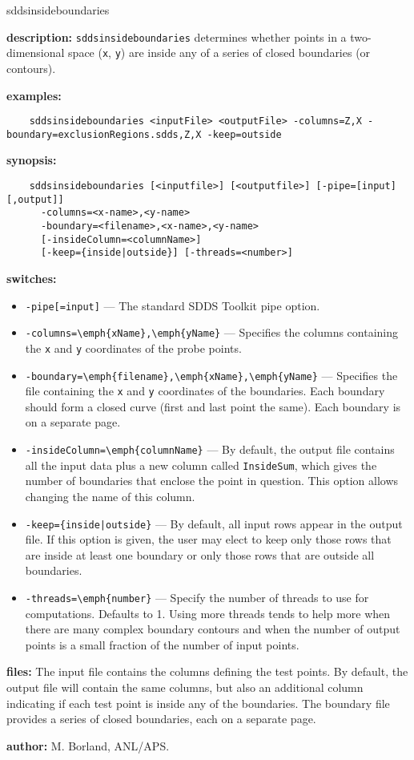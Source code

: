 \begin{sddsprog}{sddsinsideboundaries}
  \item {\bf description:} \verb|sddsinsideboundaries| determines whether points in a two-dimensional space (\verb|x|, \verb|y|) are inside any of a series of closed boundaries (or contours).
  \item {\bf examples:}
    \begin{verbatim}
    sddsinsideboundaries <inputFile> <outputFile> -columns=Z,X -boundary=exclusionRegions.sdds,Z,X -keep=outside
    \end{verbatim}
  \item {\bf synopsis:}
    \begin{verbatim}
    sddsinsideboundaries [<inputfile>] [<outputfile>] [-pipe=[input][,output]]
      -columns=<x-name>,<y-name>
      -boundary=<filename>,<x-name>,<y-name>
      [-insideColumn=<columnName>]
      [-keep={inside|outside}] [-threads=<number>]
    \end{verbatim}
  \item {\bf switches:}
    \begin{itemize}
      \item \verb|-pipe[=input]| --- The standard SDDS Toolkit pipe option.
      \item \verb|-columns=\emph{xName},\emph{yName}| --- Specifies the columns containing the \verb|x| and \verb|y| coordinates of the probe points.
      \item \verb|-boundary=\emph{filename},\emph{xName},\emph{yName}| --- Specifies the file containing the \verb|x| and \verb|y| coordinates of the boundaries. Each boundary should form a closed curve (first and last point the same). Each boundary is on a separate page.
      \item \verb|-insideColumn=\emph{columnName}| --- By default, the output file contains all the input data plus a new column called \verb|InsideSum|, which gives the number of boundaries that enclose the point in question. This option allows changing the name of this column.
      \item \verb!-keep={inside|outside}! --- By default, all input rows appear in the output file. If this option is given, the user may elect to keep only those rows that are inside at least one boundary or only those rows that are outside all boundaries.
      \item \verb|-threads=\emph{number}| --- Specify the number of threads to use for computations. Defaults to 1. Using more threads tends to help more when there are many complex boundary contours and when the number of output points is a small fraction of the number of input points.
    \end{itemize}
  \item {\bf files:}
    The input file contains the columns defining the test points. By default, the output file will contain the same columns, but also an additional column indicating if each test point is inside any of the boundaries. The boundary file provides a series of closed boundaries, each on a separate page.
  \item {\bf author:} M. Borland, ANL/APS.
\end{sddsprog}

